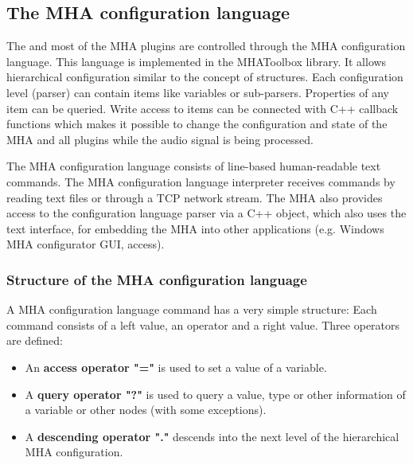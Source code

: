 
\subsection{The MHA configuration language}
\label{sec:script}

The \mhad{} and most of the MHA plugins are controlled
through the MHA configuration language. This language is implemented in the
MHAToolbox library. It allows hierarchical configuration similar to the
concept of \Matlab{} structures. 
Each configuration level (parser)
can contain items like variables or sub-parsers. Properties of any item can be
queried.  Write access to items can be connected with C++ callback functions
which makes it possible to change the configuration and state of the MHA 
and all plugins while the audio signal is being processed.

The MHA configuration language consists of line-based human-readable
text commands.
The MHA configuration language interpreter receives commands by
reading text files or through a TCP network stream.  
The MHA also provides access to the configuration language parser via
a C++ object, 
which also uses the text interface,
for embedding the MHA into other applications (e.g. Windows MHA
configurator GUI, \Matlab{} access).

\subsubsection{Structure of the MHA configuration language}

A MHA configuration language command has a very simple structure: Each
command consists of a left value, an operator and a
right value. Three operators are defined:

%
%
%
\begin{itemize}
\item An {\bf access operator "="} is used to set a value of a variable.
\item A {\bf query operator "?"}
  is used to query a value, type or other information of a variable or other
  nodes (with some exceptions).
\item A {\bf descending operator "."} descends into the next level of the
  hierarchical MHA configuration.
\end{itemize}

